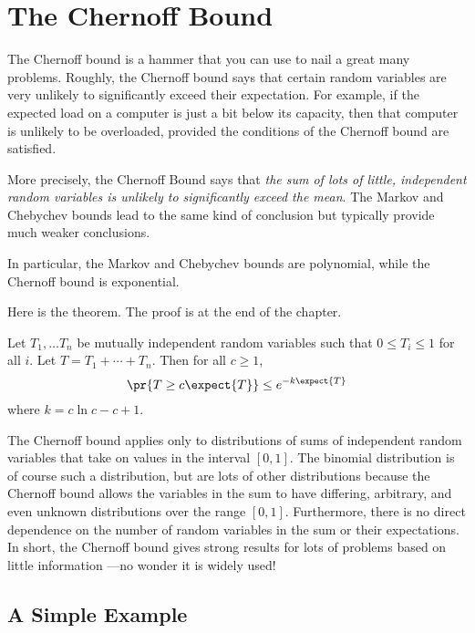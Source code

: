 \section{The Chernoff Bound}

The Chernoff bound is a hammer that you can use to nail a great many
problems.  Roughly, the Chernoff bound says that certain random
variables are very unlikely to significantly exceed their expectation.
For example, if the expected load on a computer is just a bit below
its capacity, then that computer is unlikely to be overloaded,
provided the conditions of the Chernoff bound are satisfied.

More precisely, the Chernoff Bound says that \emph{the sum of lots of
  little, independent random variables is unlikely to significantly
  exceed the mean}.  The Markov and Chebychev bounds lead to the same
kind of conclusion but typically provide much weaker conclusions.
\begin{editingnotes}
In particular, the Markov and Chebychev bounds are polynomial, while
the Chernoff bound is exponential.
\end{editingnotes}
Here is the theorem.  The proof is at the end of the chapter.

\begin{theorem}
\label{chernoff}
Let $T_1, \dots T_n$ be mutually independent random variables such
that $0 \leq T_i \leq 1$ for all $i$.  Let $T = T_1 + \cdots + T_n$.
Then for all $c \geq 1$,
\begin{equation}\label{chernoff-leq}
\pr{T \geq c \expect{T}} \leq e^{-k \expect{T}} 
\end{equation}
where $k = c \ln c - c + 1$.
\end{theorem}

The Chernoff bound applies only to distributions of sums of
independent random variables that take on values in the interval $[0,
  1]$.  The binomial distribution is of course such a distribution,
but are lots of other distributions because the Chernoff bound allows
the variables in the sum to have differing, arbitrary, and even unknown
distributions over the range $[0, 1]$.  Furthermore, there is no
direct dependence on the number of random variables in the sum or
their expectations.  In short, the Chernoff bound gives strong results
for lots of problems based on little information ---no wonder it is
widely used!

\subsection{A Simple Example}

